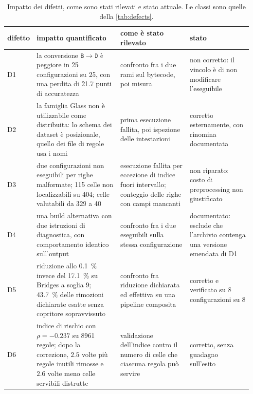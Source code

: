 \begin{table}[htbp]
\centering
\caption{Impatto dei difetti, come sono stati rilevati e stato attuale. Le classi sono quelle
della \autoref{tab:defects}.}
\label{tab:defects-impact}
\footnotesize
\begin{tabular}{@{}lp{4.1cm}p{3.1cm}p{2.1cm}@{}}
\toprule
difetto & impatto quantificato & come è stato rilevato & stato \\
\midrule
D1 & la conversione \texttt{B}$\to$\texttt{D} è peggiore in \num{25} configurazioni su \num{25},
con una perdita di \num{21.7} punti di accuratezza & confronto fra i due rami sul bytecode, poi
misura & non corretto: il vincolo è di non modificare l'eseguibile \\
D2 & la famiglia Glass non è utilizzabile come distribuita: lo schema dei dataset è posizionale,
quello dei file di regole usa i nomi & prima esecuzione fallita, poi ispezione delle intestazioni & corretto esternamente, con rinomina documentata \\
D3 & due configurazioni non eseguibili per righe malformate; \num{115} celle non localizzabili su
\num{404}; celle valutabili da \num{329} a \num{40} & esecuzione fallita per eccezione di
indice fuori intervallo; conteggio delle righe con campi mancanti & non riparato: costo di preprocessing non giustificato \\
D4 & una build alternativa con due istruzioni di diagnostica, con comportamento identico
sull'output & confronto fra i due eseguibili sulla stessa configurazione & documentato: esclude che l'archivio contenga una versione emendata di D1 \\
D5 & riduzione allo \SI{0.1}{\percent} invece del \SI{17.1}{\percent} su Bridges a soglia 9;
\SI{43.7}{\percent} delle rimozioni dichiarate esatte senza copritore sopravvissuto & confronto fra
riduzione dichiarata ed effettiva su una pipeline composita & corretto e verificato su \num{8} configurazioni su \num{8} \\
D6 & indice di rischio con $\rho = -0.237$ su \num{8961} regole; dopo la correzione, $2.5$ volte
più regole inutili rimosse e $2.6$ volte meno celle servibili distrutte & validazione dell'indice
contro il numero di celle che ciascuna regola può servire & corretto, senza guadagno sull'esito \\
\bottomrule
\end{tabular}
\end{table}


